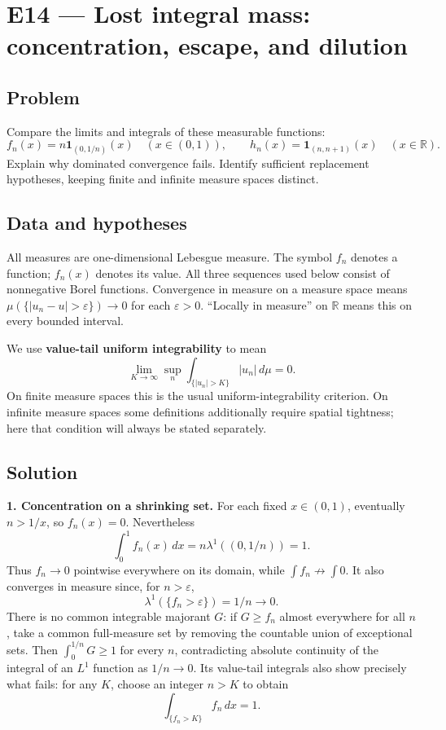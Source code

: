 \documentclass[
  11pt,
]{article}
\begin{document}
\section{E14 --- Lost integral mass: concentration, escape, and
dilution}\label{E14}

\subsection{Problem}\label{problem-13}

Compare the limits and integrals of these measurable functions: \[
f_n(x)=n\mathbf1_{(0,1/n)}(x)\quad(x\in(0,1)),\qquad
h_n(x)=\mathbf1_{(n,n+1)}(x)\quad(x\in\mathbb R).
\] Explain why dominated convergence fails. Identify sufficient
replacement hypotheses, keeping finite and infinite measure spaces
distinct.

\subsection{Data and hypotheses}\label{data-and-hypotheses-13}

All measures are one-dimensional Lebesgue measure. The symbol \(f_n\)
denotes a function; \(f_n(x)\) denotes its value. All three sequences
used below consist of nonnegative Borel functions. Convergence in
measure on a measure space means \(\mu(\{|u_n-u|>\varepsilon\})\to0\)
for each \(\varepsilon>0\). ``Locally in measure'' on \(\mathbb R\)
means this on every bounded interval.

We use \textbf{value-tail uniform integrability} to mean \[
\lim_{K\to\infty}\sup_n\int_{\{|u_n|>K\}}|u_n|\,d\mu=0.
\] On finite measure spaces this is the usual uniform-integrability
criterion. On infinite measure spaces some definitions additionally
require spatial tightness; here that condition will always be stated
separately.

\subsection{Solution}\label{solution-13}

\textbf{1. Concentration on a shrinking set.} For each fixed
\(x\in(0,1)\), eventually \(n>1/x\), so \(f_n(x)=0\). Nevertheless \[
\int_0^1 f_n(x)\,dx=n\lambda^1((0,1/n))=1.
\] Thus \(f_n\to0\) pointwise everywhere on its domain, while
\(\int f_n\not\to\int0\). It also converges in measure since, for
\(n>\varepsilon\), \[
\lambda^1(\{f_n>\varepsilon\})=1/n\longrightarrow0.
\] There is no common integrable majorant \(G\): if \(G\ge f_n\) almost
everywhere for all \(n\), take a common full-measure set by removing the
countable union of exceptional sets. Then \(\int_0^{1/n}G\ge1\) for
every \(n\), contradicting absolute continuity of the integral of an
\(L^1\) function as \(1/n\to0\). Its value-tail integrals also show
precisely what fails: for any \(K\), choose an integer \(n>K\) to obtain
\[
\int_{\{f_n>K\}}f_n\,dx=1.
\]
\end{document}

